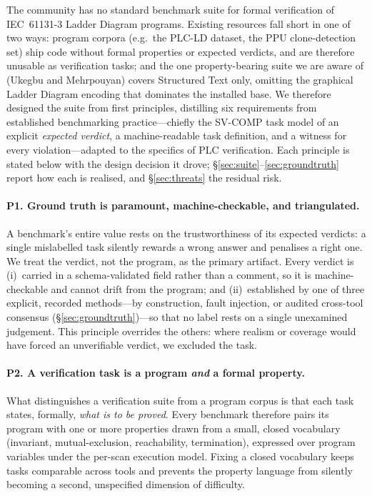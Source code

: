 The community has no standard benchmark suite for formal verification of IEC~61131-3
Ladder Diagram programs. Existing resources fall short in one of two ways: program
corpora (e.g.\ the PLC-LD dataset, the PPU clone-detection set) ship code without formal
properties or expected verdicts, and are therefore unusable as verification tasks; and
the one property-bearing suite we are aware of (Ukegbu and Mehrpouyan) covers Structured
Text only, omitting the graphical Ladder Diagram encoding that dominates the installed
base. We therefore designed the suite from first principles, distilling six requirements
from established benchmarking practice---chiefly the SV-COMP task model of an explicit
\emph{expected verdict}, a machine-readable task definition, and a witness for every
violation---adapted to the specifics of PLC verification. Each principle is stated below
with the design decision it drove; \S\ref{sec:suite}--\ref{sec:groundtruth} report how
each is realised, and \S\ref{sec:threats} the residual risk.

\paragraph{P1. Ground truth is paramount, machine-checkable, and triangulated.}
A benchmark's entire value rests on the trustworthiness of its expected verdicts: a single
mislabelled task silently rewards a wrong answer and penalises a right one. We treat the
verdict, not the program, as the primary artifact. Every verdict is (i)~carried in a
schema-validated field rather than a comment, so it is machine-checkable and cannot drift
from the program; and (ii)~established by one of three explicit, recorded methods---by
construction, fault injection, or audited cross-tool consensus (\S\ref{sec:groundtruth})---so
that no label rests on a single unexamined judgement. This principle overrides the others:
where realism or coverage would have forced an unverifiable verdict, we excluded the task.

\paragraph{P2. A verification task is a program \emph{and} a formal property.}
What distinguishes a verification suite from a program corpus is that each task states,
formally, \emph{what is to be proved}. Every benchmark therefore pairs its program with one
or more properties drawn from a small, closed vocabulary (invariant, mutual-exclusion,
reachability, termination), expressed over program variables under the per-scan execution
model. Fixing a closed vocabulary keeps tasks comparable across tools and prevents the
property language from silently becoming a second, unspecified dimension of difficulty.

